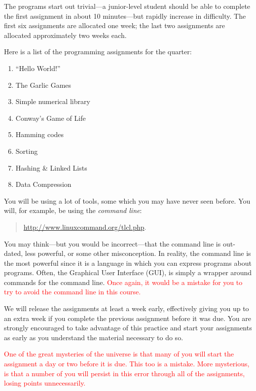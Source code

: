 \documentclass{article}
\begin{document}
The programs start out trivial---a junior-level student should be able to
complete the first assignment in about 10 minutes---but rapidly increase in
difficulty. The first six assignments are allocated one week; the last two
assignments are allocated approximately two weeks each.

Here is a list of the programming assignments for the quarter:
\begin{multicols}{2}
\begin{enumerate}[start=0]
  \item ``Hello World!''
  \item The Garlic Games
  \item Simple numerical library
  \item Conway's Game of Life
  \item Hamming codes
  \item Sorting
  \item Hashing \& Linked Lists
  \item Data Compression
\end{enumerate}
\end{multicols}

You will be using a lot of tools, some which you may have never seen before. You
will, for example, be using the \emph{command line}:
\begin{quotation}
\centerline{\url{http://www.linuxcommand.org/tlcl.php}.}
\end{quotation}
You may think---but you would be incorrect---that the command line is out-dated,
less powerful, or some other misconception. In reality, the command line is the
most powerful since it is a language in which you can express programs about
programs. Often, the Graphical User Interface (GUI), is simply a wrapper around
commands for the command line. \textcolor{red}{Once again, it would be a
mistake for you to try to avoid the command line in this course.}

We will release the assignments at least a week early, effectively giving you up
to an extra week if you complete the previous assignment before it was due. You
are strongly encouraged to take advantage of this practice and start your
assignments as early as you understand the material necessary to do so.

\textcolor{red}{One of the great mysteries of the universe is that many of you
will start the assignment a day or two before it is due. This too is a mistake.
More mysterious, is that a number of you will persist in this error through all
of the assignments, losing points unnecessarily.}
\end{document}
